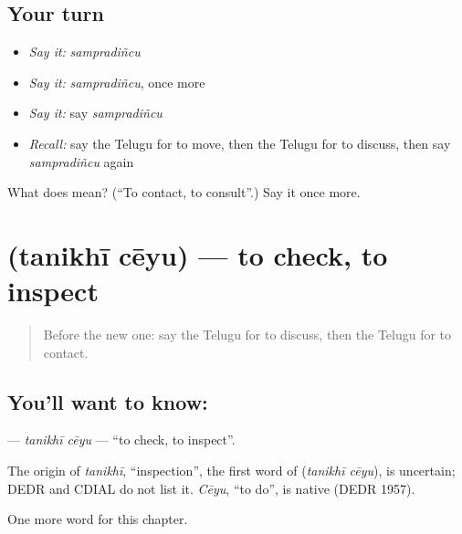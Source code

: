 \subsection*{Your turn}
\begin{itemize}
\raggedright
  \item \emph{Say it:} \emph{sampradiñcu}
  \item \emph{Say it:} \emph{sampradiñcu}, once more
  \item \emph{Say it:} say \emph{sampradiñcu}
  \item \emph{Recall:} say the Telugu for to move, then the Telugu for to discuss, then say \emph{sampradiñcu} again
\end{itemize}

\begin{tcolorbox}[breakable,colback=teal!4,colframe=teal!35!black,title={Before you move on}]
What does  mean? (\textquotedblleft{}To contact, to consult\textquotedblright{}.) Say it once more.
\end{tcolorbox}
\section[\texorpdfstring{\te{తనిఖీ} \te{చేయు} (tanikhī cēyu)}{తనిఖీ చేయు (tanikhī cēyu)}]{  (tanikhī cēyu) — to check, to inspect}

\label{lesson:TE-C202-tanikhi-ceyu}



\begin{quote}
Before the new one: say the Telugu for to discuss, then the Telugu for to contact.
\end{quote}

\subsection*{You'll want to know:  }
\textbf{ } — \emph{tanikhī cēyu} — \textquotedblleft{}to check, to inspect\textquotedblright{}.

\begin{cousinweb}
The origin of \emph{tanikhī}, \textquotedblleft{}inspection\textquotedblright{}, the first word of \textbf{ } (\emph{tanikhī cēyu}), is uncertain; DEDR and CDIAL do not list it. \emph{Cēyu}, \textquotedblleft{}to do\textquotedblright{}, is native (DEDR 1957).
\end{cousinweb}

\begin{grammarlens}[title={What you've built}]
One more word for this chapter.
\end{grammarlens}

